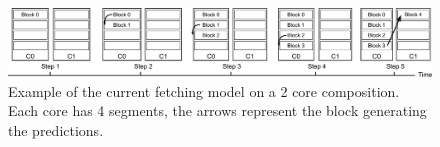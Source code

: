 \begin{figure}[t]
    \centering
    \includegraphics[width=1\textwidth]{chapter3/graphics/normfetch.pdf}
    \caption{Example of the current fetching model on a 2 core composition. Each core has 4 segments, the arrows represent the block generating the predictions.}
    \label{fig:old_fetch}
\vspace{1em}
\end{figure}






